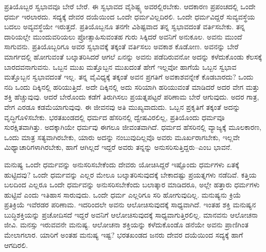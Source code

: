 ಪ್ರತಿಯೊಬ್ಬರ ಸ್ವಭಾವವೂ ಬೇರೆ ಬೇರೆ. ಈ ಸ್ವಭಾವದ ವೈಶಿಷ್ಟ್ಯ ಅವರಲ್ಲಿರಬೇಕು. ಆದಕಾರಣ ಪ್ರಪಂಚದಲ್ಲಿ ಒಂದೇ ಧರ್ಮ ಇರಲಾರದು. ಸದ್ಯಕ್ಕೆ ದೇವರ ದಯೆಯಿಂದ ಒಂದೇ ಧರ್ಮವಿಲ್ಲದಿರಲಿ. ಒಂದೇ ಧರ್ಮವಿದ್ದರೆ ಸುವ್ಯವಸ್ಥೆಯ ಬದಲು ಅವ್ಯವಸ್ಥೆಯೇ ಇರುತ್ತದೆ. ಪ್ರತಿಯೊಬ್ಬನೂ ತನಗೇ ವಿಶಿಷ್ಟವಾದ ತನ್ನ ಸ್ವಭಾವದಂತೆ ವರ್ತಿಸಬೇಕು. ತನ್ನ ದಾರಿಯಲ್ಲೇ ಮುಂದುವರಿಯಲು ಪ್ರೋತ್ಸಾಹಿಸುವಂತಹ ಗುರು ಸಿಕ್ಕಿದರೆ ಅವನಿಗೆ ಅನುಕೂಲ. ಅವನು ಮುಂದೆ ಸಾಗುವನು. ಪ್ರತಿಯೊಬ್ಬರಿಗೂ ಅವರ ಸ್ವಭಾವಕ್ಕೆ ತಕ್ಕಂತೆ ವರ್ತಿಸಲು ಅವಕಾಶ ಕೊಡೋಣ. ಅವನನ್ನು ಬೇರೆ ಮಾರ್ಗದಲ್ಲಿ ಹೋಗುವಂತೆ ಬಲ್ಕಾತರಿಸಿದರೆ ಆಗಲೆ ಏನನ್ನು ಅವನು ಪಡೆದಿರುವನೋ ಅದನ್ನು ಕಳೆದುಕೊಂಡು ಕೆಲಸಕ್ಕೆ ಬಾರದವನಾಗುವನು. ಒಬ್ಬನ ಮುಖ ಮತ್ತೊಬ್ಬನ ಮುಖದಂತೆ ಹೇಗೆ ಇಲ್ಲವೋ ಹಾಗೆಯೆ ಒಬ್ಬನ ಸ್ವಭಾವ ಮತ್ತೊಬ್ಬನ ಸ್ವಭಾವದಂತೆ ಇಲ್ಲ. ತನ್ನ ವೈವಿಧ್ಯಕ್ಕೆ ತಕ್ಕಂತೆ ಅವನ ಪ್ರಗತಿಗೆ ಅವಕಾಶವನ್ನೇಕೆ ಕೊಡಬಾರದು? ಒಂದು ನದಿ ಒಂದು ದಿಕ್ಕಿನಲ್ಲಿ ಹರಿಯುತ್ತಿದೆ. ಅದೇ ದಿಕ್ಕಿನಲ್ಲಿ ಅದು ಸರಿಯಾಗಿ ಹರಿಯುವಂತೆ ಮಾಡಿದರೆ ಅದರ ವೇಗ ಮತ್ತು ಶಕ್ತಿ ಹೆಚ್ಚುವುವು. ಆದರೆ ಬೇರೊಂದು ಕಡೆಗೆ ತಿರುಗಿಸಲು ಪ್ರಯತ್ನಪಟ್ಟರೆ ಪರಿಣಾಮ ಬೇರೆ ಆಗುವುದು. ಅದರ ಗಾತ್ರ, ವೇಗ ಎರಡೂ ಕಡಮೆಯಾಗುವುವು. ಈ ಜೀವನವು ಅತಿ ಮುಖ್ಯವಾದುದು. ಒಬ್ಬನ ಪ್ರಕೃತಿಗೆ ತಕ್ಕಂತೆ ಅದನ್ನು ವೃದ್ಧಿಗೊಳಿಸಬೇಕು. ಭರತಖಂಡದಲ್ಲಿ ಧರ್ಮದ ಹೆಸರಿನಲ್ಲಿ ದ್ವೇಷವಿರಲಿಲ್ಲ, ಪ್ರತಿಯೊಂದು ಧರ್ಮವೂ ಸುರಕ್ಷಿತವಾಗಿತ್ತು. ಅದಕ್ಕಾಗಿಯೇ ಧರ್ಮವು ಈಗಲೂ ಜೀವಂತವಾಗಿದೆ. ಧರ್ಮದ ಹೆಸರಿನಲ್ಲಿ ವ್ಯಾಜ್ಯಕ್ಕೆ ಮೂಲಕಾರಣ, ಒಂದು ಮಾತ್ರ ಸತ್ಯವಾಗಿರಬೇಕು, ಯಾರು ಅದನ್ನು ನಂಬುವುದಿಲ್ಲವೊ ಅವರು ಮೂರ್ಖರಾಗಬೇಕು, ಇಲ್ಲವೇ ಮಿಥ್ಯಾಚಾರಿಗಳಾಗಿರಬೇಕು, ಹಾಗೆ ಆಗಿಲ್ಲದೆ ಇದ್ದರೆ ಅವರು ತನ್ನನ್ನು ಅನುಸರಿಸುತ್ತಿದ್ದರು–ಎಂಬ ಭಾವನೆ.

ಮನುಷ್ಯ ಒಂದೇ ಧರ್ಮವನ್ನು ಅನುಸರಿಸಬೇಕೆಂದು ದೇವರು ಯೋಚಿಸಿದ್ದರೆ ಇಷ್ಟೊಂದು ಧರ್ಮಗಳು ಏತಕ್ಕೆ ಹುಟ್ಟಿದವು? ಒಂದೇ ಧರ್ಮವನ್ನು ಎಲ್ಲರ ಮೇಲೂ ಬಲ್ಕಾತರಿಸುವುದಕ್ಕೆ ಬೇಕಾದಷ್ಟು ಪ್ರಯತ್ನಗಳು ನಡೆದಿವೆ. ಕತ್ತಿಯ ಬಲದಿಂದ ಎಲ್ಲರೂ ಒಂದೇ ಧರ್ಮವನ್ನು ಅನುಸರಿಸಬೇಕೆಂದು ಬಲಾತ್ಕಾರ ಮಾಡಿದರೂ, ಅಲ್ಲೇ ಹತ್ತಾರು ಧರ್ಮಗಳು ಹುಟ್ಟಿವೆ ಎಂದು ಇತಿಹಾಸ ಸಾರುವುದು. ಒಂದೇ ಧರ್ಮ ಎಲ್ಲರಿಗೂ ಸರಿ ಹೋಗುವುದಿಲ್ಲ. ಮನುಷ್ಯನು ಕ್ರಿಯೆ ಪ್ರತಿಕ್ರಿಯೆ ಇವೆರಡರ ಪರಿಣಾಮ. ಇದರಿಂದಲೇ ಅವನು ಆಲೋಚಿಸುವುದಕ್ಕೆ ಸಾಧ್ಯವಾಗಿದೆ. ಇಂತಹ ಶಕ್ತಿ ಮನುಷ್ಯನ ಬುದ್ಧಿಶಕ್ತಿಯನ್ನು ಪ್ರಚೋದಿಸದೆ ಇದ್ದರೆ ಅವನಿಗೆ ಆಲೋಚಿಸುವುದಕ್ಕೆ ಸಾಧ್ಯವಾಗುತ್ತಿರಲಿಲ್ಲ. ಮಾನವನು ಆಲೋಚನಾ ಜೀವಿ. ಮನಸ್ಸು ಇರುವವನೇ ಮನುಷ್ಯ. ಆಲೋಚನಾ ಶಕ್ತಿಯನ್ನು ಕಳೆದುಕೊಂಡೊ ಡನೆಯೇ ಅವನು ಪ್ರಾಣಿಗಿಂತ ಮೇಲಾಗಲಾರ. ಯಾರಿಗೆ ಅಂತಹ ಮನುಷ್ಯ ಇಷ್ಟ? ಭರತಖಂಡದ ಜನರು ದೇವರ ದಯೆಯಿಂದ ಸದ್ಯಕ್ಕೆ ಹಾಗೆ ಆಗದಿರಲಿ.

